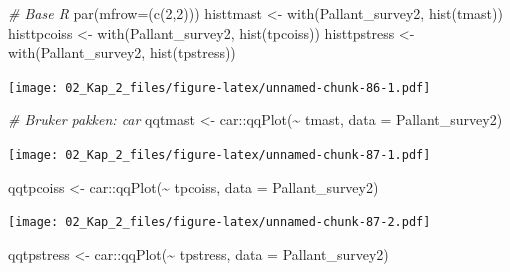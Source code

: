 \documentclass[
]{article}
\newenvironment{Shaded}{\begin{snugshade}}{\end{snugshade}}
\newcommand{\AttributeTok}[1]{\textcolor[rgb]{0.77,0.63,0.00}{#1}}
\newcommand{\CommentTok}[1]{\textcolor[rgb]{0.56,0.35,0.01}{\textit{#1}}}
\newcommand{\DecValTok}[1]{\textcolor[rgb]{0.00,0.00,0.81}{#1}}
\newcommand{\FunctionTok}[1]{\textcolor[rgb]{0.00,0.00,0.00}{#1}}
\newcommand{\NormalTok}[1]{#1}
\newcommand{\OtherTok}[1]{\textcolor[rgb]{0.56,0.35,0.01}{#1}}
\newcommand{\SpecialCharTok}[1]{\textcolor[rgb]{0.00,0.00,0.00}{#1}}
\begin{document}
\begin{Shaded}
\begin{Highlighting}[]
\CommentTok{\# Base R}
\FunctionTok{par}\NormalTok{(}\AttributeTok{mfrow=}\NormalTok{(}\FunctionTok{c}\NormalTok{(}\DecValTok{2}\NormalTok{,}\DecValTok{2}\NormalTok{)))}
\NormalTok{histtmast }\OtherTok{\textless{}{-}} \FunctionTok{with}\NormalTok{(Pallant\_survey2, }\FunctionTok{hist}\NormalTok{(tmast))}
\NormalTok{histtpcoiss }\OtherTok{\textless{}{-}} \FunctionTok{with}\NormalTok{(Pallant\_survey2, }\FunctionTok{hist}\NormalTok{(tpcoiss))}
\NormalTok{histtpstress }\OtherTok{\textless{}{-}} \FunctionTok{with}\NormalTok{(Pallant\_survey2, }\FunctionTok{hist}\NormalTok{(tpstress))}
\end{Highlighting}
\end{Shaded}

\texttt{[image: 02\_Kap\_2\_files/figure-latex/unnamed-chunk-86-1.pdf]}

\begin{Shaded}
\begin{Highlighting}[]
\CommentTok{\# Bruker pakken: car}
\NormalTok{qqtmast }\OtherTok{\textless{}{-}}\NormalTok{ car}\SpecialCharTok{::}\FunctionTok{qqPlot}\NormalTok{(}\SpecialCharTok{\textasciitilde{}}\NormalTok{ tmast, }\AttributeTok{data =}\NormalTok{ Pallant\_survey2)}
\end{Highlighting}
\end{Shaded}

\texttt{[image: 02\_Kap\_2\_files/figure-latex/unnamed-chunk-87-1.pdf]}

\begin{Shaded}
\begin{Highlighting}[]
\NormalTok{qqtpcoiss }\OtherTok{\textless{}{-}}\NormalTok{ car}\SpecialCharTok{::}\FunctionTok{qqPlot}\NormalTok{(}\SpecialCharTok{\textasciitilde{}}\NormalTok{ tpcoiss, }\AttributeTok{data =}\NormalTok{ Pallant\_survey2)}
\end{Highlighting}
\end{Shaded}

\texttt{[image: 02\_Kap\_2\_files/figure-latex/unnamed-chunk-87-2.pdf]}

\begin{Shaded}
\begin{Highlighting}[]
\NormalTok{qqtpstress }\OtherTok{\textless{}{-}}\NormalTok{ car}\SpecialCharTok{::}\FunctionTok{qqPlot}\NormalTok{(}\SpecialCharTok{\textasciitilde{}}\NormalTok{ tpstress, }\AttributeTok{data =}\NormalTok{ Pallant\_survey2)}
\end{Highlighting}
\end{Shaded}
\end{document}
